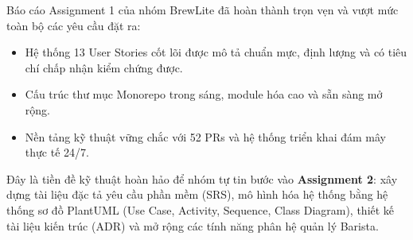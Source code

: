 \documentclass[12pt, a4paper]{article}
\begin{document}
Báo cáo Assignment 1 của nhóm BrewLite đã hoàn thành trọn vẹn và vượt mức toàn bộ các yêu cầu đặt ra:
\begin{itemize}[itemsep=4pt]
  \item Hệ thống 13 User Stories cốt lõi được mô tả chuẩn mực, định lượng và có tiêu chí chấp nhận kiểm chứng được.
  \item Cấu trúc thư mục Monorepo trong sáng, module hóa cao và sẵn sàng mở rộng.
  \item Nền tảng kỹ thuật vững chắc với 52 PRs và hệ thống triển khai đám mây thực tế 24/7.
\end{itemize}

\begin{highlightbox}
Đây là tiền đề kỹ thuật hoàn hảo để nhóm tự tin bước vào \textbf{Assignment 2}: xây dựng tài liệu đặc tả yêu cầu phần mềm (SRS), mô hình hóa hệ thống bằng hệ thống sơ đồ PlantUML (Use Case, Activity, Sequence, Class Diagram), thiết kế tài liệu kiến trúc (ADR) và mở rộng các tính năng phân hệ quản lý Barista.
\end{highlightbox}
\end{document}
